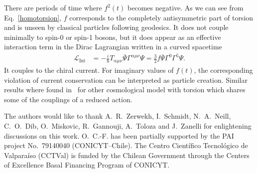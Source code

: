 \documentclass[aps,prd,12pt,superscriptaddress,showpacs,showkeys,longbibliography,reprint,nofootinbib]{revtex4-1}
\begin{document}


There are periods of time where $f^2(t)$ becomes negative. As we can see from Eq.~\eqref{homotorsion}, $f$ corresponds to the completely antisymmetric part of torsion and is unseen by classical particles following geodesics. It does not couple minimally to spin-0 or spin-1 bosons, but it does appear as an effective interaction term in the Dirac Lagrangian written in a curved spacetime~\cite{Hehl:1976kj}
\begin{align*}
  \mathcal{L}_{\text{Int}}&=-\frac{i}{8}T_{\alpha\mu\nu}\bar{\Psi}\Gamma^{\alpha\mu\nu}\Psi =\frac{3}{2}f\bar{\Psi}\Gamma^0\Gamma^5\Psi.
\end{align*}
It couples to the chiral current. For imaginary values of $f(t)$, the corresponding violation of current conservation can be interpreted as particle creation. Similar results where found in~\cite{Toloza:2013wi} for other cosmological model with torsion which shares some of the couplings of a reduced action.

\begin{acknowledgments}
  The authors would like to thank A.~R.~Zerwekh, I.~Schmidt, N.~A.~Neill, C.~O.~Dib, O.~Miskovic, R.~Gannouji, A.~Toloza and J.~Zanelli for enlightening discussions on this work. \mbox{O.~C.-F.} has been partially supported by the PAI project No.~79140040 (CONICYT--Chile). The Centro Cient\'ifico Tecnol\'ogico de Valpara\'iso (CCTVal) is funded by the Chilean Government through the Centers of Excellence Basal Financing Program of CONICYT.
\end{acknowledgments}
\end{document}
